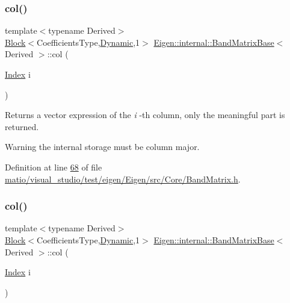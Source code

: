\subsubsection{\texorpdfstring{col()}{col()}\hspace{0.1cm}{\footnotesize\ttfamily [1/2]}}
{\footnotesize\ttfamily template$<$typename Derived$>$ \\
\hyperlink{group___core___module_class_eigen_1_1_block}{Block}$<$Coefficients\+Type,\hyperlink{namespace_eigen_ad81fa7195215a0ce30017dfac309f0b2}{Dynamic},1$>$ \hyperlink{class_eigen_1_1internal_1_1_band_matrix_base}{Eigen\+::internal\+::\+Band\+Matrix\+Base}$<$ Derived $>$\+::col (\begin{DoxyParamCaption}\item[{\hyperlink{group___core___module_a554f30542cc2316add4b1ea0a492ff02}{Index}}]{i }\end{DoxyParamCaption})\hspace{0.3cm}{\ttfamily [inline]}}

\begin{DoxyReturn}{Returns}
a vector expression of the {\itshape i} -\/th column, only the meaningful part is returned. 
\end{DoxyReturn}
\begin{DoxyWarning}{Warning}
the internal storage must be column major. 
\end{DoxyWarning}


Definition at line \hyperlink{matio_2visual__studio_2test_2eigen_2_eigen_2src_2_core_2_band_matrix_8h_source_l00068}{68} of file \hyperlink{matio_2visual__studio_2test_2eigen_2_eigen_2src_2_core_2_band_matrix_8h_source}{matio/visual\+\_\+studio/test/eigen/\+Eigen/src/\+Core/\+Band\+Matrix.\+h}.

\mbox{\label{class_eigen_1_1internal_1_1_band_matrix_base_aca78a4990b6827b0b3086e28e6ae4257}} 
\subsubsection{\texorpdfstring{col()}{col()}\hspace{0.1cm}{\footnotesize\ttfamily [2/2]}}
{\footnotesize\ttfamily template$<$typename Derived$>$ \\
\hyperlink{group___core___module_class_eigen_1_1_block}{Block}$<$Coefficients\+Type,\hyperlink{namespace_eigen_ad81fa7195215a0ce30017dfac309f0b2}{Dynamic},1$>$ \hyperlink{class_eigen_1_1internal_1_1_band_matrix_base}{Eigen\+::internal\+::\+Band\+Matrix\+Base}$<$ Derived $>$\+::col (\begin{DoxyParamCaption}\item[{\hyperlink{group___core___module_a554f30542cc2316add4b1ea0a492ff02}{Index}}]{i }\end{DoxyParamCaption})\hspace{0.3cm}{\ttfamily [inline]}}

